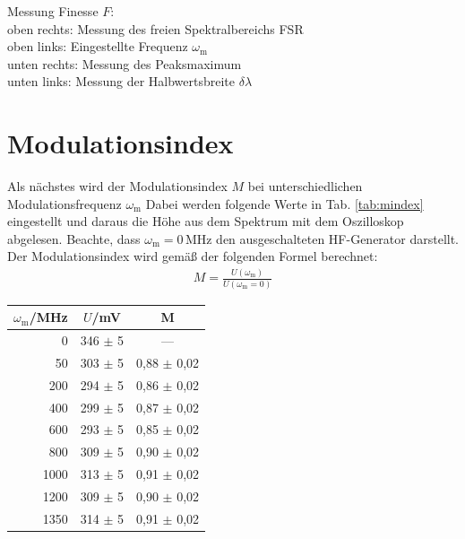 \begin{center}
\begin{tabular}{c c}
    \end{tabular}
    \caption{Messung Finesse $F$:\\
    oben rechts: Messung des freien Spektralbereichs FSR\\
    oben links: Eingestellte Frequenz  $\omega_\mathrm{m}$\\
    unten rechts: Messung des Peaksmaximum\\
    unten links: Messung der Halbwertsbreite $\delta \lambda$}
    \label{fig:finess}
\end{center}

\newpage
\section{Modulationsindex}
\label{sec:mindex}

Als nächstes wird der Modulationsindex $M$ bei unterschiedlichen Modulationsfrequenz $\omega_\mathrm{m}$ Dabei werden folgende Werte in Tab. \ref{tab:mindex} eingestellt und daraus die Höhe aus dem Spektrum mit dem Oszilloskop abgelesen. Beachte, dass $\omega_\mathrm{m} = 0$\,MHz den ausgeschalteten HF-Generator darstellt. Der Modulationsindex wird gemäß der folgenden Formel berechnet:
\begin{gather}
    M = \frac{U(\omega_\mathrm{m})}{U(\omega_\mathrm{m} = 0)}
\end{gather}
\begin{center}
    \captionsetup{type=table}
    \begin{tabular}{r | c c}
        $\omega_\mathrm{m}$/MHz & $U$/mV & M \\ \hline
        0    & 346 $\pm$ 5 & --- \\
        50   & 303 $\pm$ 5 & 0,88 $\pm$ 0,02 \\
        200  & 294 $\pm$ 5 & 0,86 $\pm$ 0,02 \\
        400  & 299 $\pm$ 5 & 0,87 $\pm$ 0,02 \\
        600  & 293 $\pm$ 5 & 0,85 $\pm$ 0,02 \\
        800  & 309 $\pm$ 5 & 0,90 $\pm$ 0,02 \\
        1000 & 313 $\pm$ 5 & 0,91 $\pm$ 0,02 \\
        1200 & 309 $\pm$ 5 & 0,90 $\pm$ 0,02 \\
        1350 & 314 $\pm$ 5 & 0,91 $\pm$ 0,02 \\
    \end{tabular}
    \label{tab:mindex}
\end{center}

